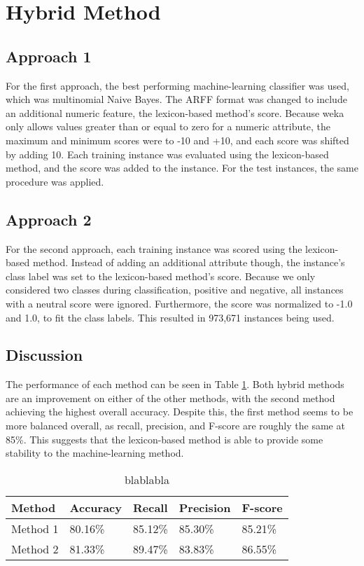 \section{Hybrid Method}

\subsection{Approach 1}
For the first approach, the best performing machine-learning classifier was used, which was multinomial Naive Bayes. The ARFF format was changed to include an additional numeric feature, the lexicon-based method's score. Because weka only allows values greater than or equal to zero for a numeric attribute, the maximum and minimum scores were  to -10 and +10, and each score was shifted by adding 10. Each training instance was evaluated using the lexicon-based method, and the score was added to the instance. For the test instances, the same procedure was applied.
\subsection{Approach 2}
For the second approach, each training instance was scored using the lexicon-based method. Instead of adding an additional attribute though, the instance's class label was set to the lexicon-based method's score. Because we only considered two classes during classification, positive and negative, all instances with a neutral score were ignored. Furthermore, the score was normalized to -1.0 and 1.0, to fit the class labels. This resulted in 973,671 instances being used.
\subsection{Discussion}


The performance of each method can be seen in Table \ref{tab:evaluations_hybrid}. Both hybrid methods are an improvement on either of the other methods, with the second method achieving the highest overall accuracy. Despite this, the first method seems to be more balanced overall, as recall, precision, and F-score are roughly the same at 85\%. This suggests that the lexicon-based method is able to provide some stability to the machine-learning method. 

\begin{table}
\caption{blablabla}
\centering
\begin{tabular}{ |p{2cm}||p{2cm}|p{2cm}|p{2cm}|p{2cm}|}
 \hline
 Method &          Accuracy &      Recall &     Precision& F-score \\
 \hline
 Method 1       & 80.16\%&        85.12\%&       85.30\%& 85.21\%\\
  \hline
 Method 2       & 81.33\%&        89.47\%&       83.83\%& 86.55\%\\
  \hline
\end{tabular}
\label{tab:evaluations_hybrid}
\end{table}

